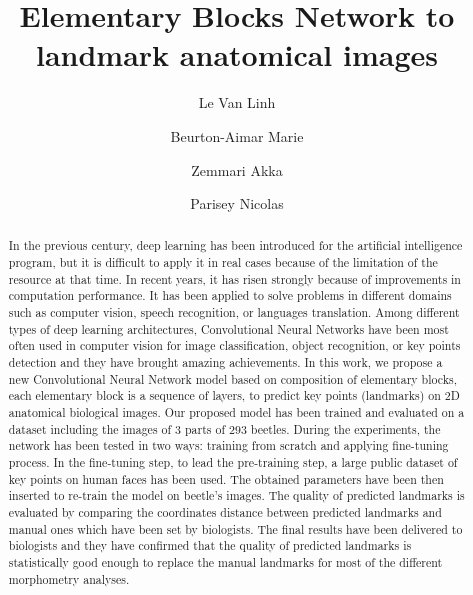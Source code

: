 \documentclass[review]{elsarticle}
\begin{document}
\begin{frontmatter}

\title{Elementary Blocks Network to landmark anatomical images}


\author[labri,itdlu]{Le Van Linh}
\author[labri]{Beurton-Aimar Marie}
\author[labri]{Zemmari Akka}
\author[igepp]{Parisey Nicolas}


\address[labri]{University of Bordeaux, 351, cours de la Liberation, 33405 Talence, France}

\address[igepp]{UMR 1349 IGEPP, BP 35327, 35653 Le Rheu, France}
\address[itdlu]{Dalat University, Dalat, Lam Dong, Vietnam}

\begin{abstract}
In the previous century, deep learning has been introduced for the artificial intelligence program, but it is difficult to apply it in real cases because of the limitation of the resource at that time. In recent years, it has risen strongly because of improvements in computation performance. It
has been applied to solve problems in different domains such as
computer vision, speech recognition, or languages translation. Among
different types of deep learning architectures, Convolutional Neural
Networks have been most often used in computer vision for image
classification, object recognition, or key points detection and they
have brought amazing achievements. In this work, we propose a new
Convolutional Neural Network model based on composition of elementary
blocks, each elementary block is a sequence of layers,  to predict key points (landmarks) on 2D anatomical
biological images. Our proposed model has been trained and evaluated
on a dataset including the images of $3$ parts of $293$
beetles. During the experiments, the network has been tested in two
ways: training from scratch and applying fine-tuning process. In the fine-tuning step, to lead
the pre-training step, a large public dataset of key points on human
faces has been used. The obtained parameters have been then inserted
to re-train the model on beetle's images. The quality of predicted
landmarks is evaluated by comparing the coordinates distance between
predicted landmarks and manual ones which have been set by
biologists. The final results have been delivered to biologists and
they have confirmed that the quality of predicted landmarks is
statistically good enough to replace the manual landmarks for most of
the different morphometry analyses.


\end{abstract}
\end{frontmatter}
\end{document}
